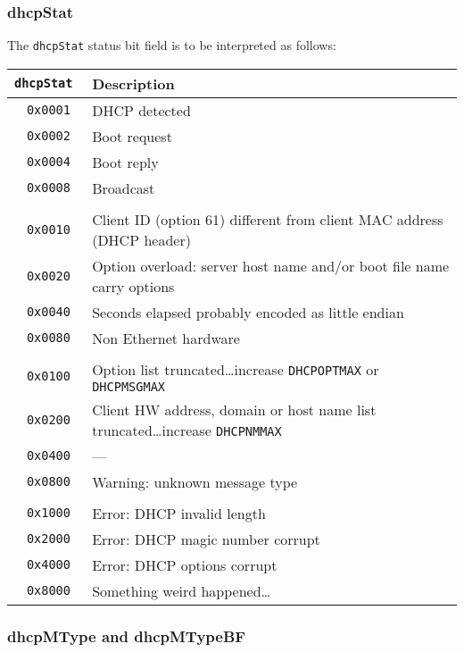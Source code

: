 \documentclass[documentation]{subfiles}
\begin{document}
\subsubsection{dhcpStat}\label{dhcpStat}
The {\tt dhcpStat} status bit field is to be interpreted as follows:
\begin{longtable}{>{\tt}rl}
    \toprule
    {\bf dhcpStat} & {\bf Description}\\
    \midrule\endhead%
    0x0001 & DHCP detected\\
    0x0002 & Boot request\\
    0x0004 & Boot reply\\
    0x0008 & Broadcast\\
    \\
    0x0010 & Client ID (option 61) different from client MAC address (DHCP header)\\
    0x0020 & Option overload: server host name and/or boot file name carry options\\
    0x0040 & Seconds elapsed probably encoded as little endian\\
    0x0080 & Non Ethernet hardware\\
    \\
    0x0100 & Option list truncated\ldots increase {\tt DHCPOPTMAX} or {\tt DHCPMSGMAX} \\
    0x0200 & Client HW address, domain or host name list truncated\ldots increase {\tt DHCPNMMAX}\\
    0x0400 & ---\\
    0x0800 & Warning: unknown message type\\
    \\
    0x1000 & Error: DHCP invalid length\\
    0x2000 & Error: DHCP magic number corrupt\\
    0x4000 & Error: DHCP options corrupt\\
    0x8000 & Something weird happened\ldots\\
    \bottomrule
\end{longtable}

\subsubsection{dhcpMType and dhcpMTypeBF}\label{dhcpMType}
\end{document}
